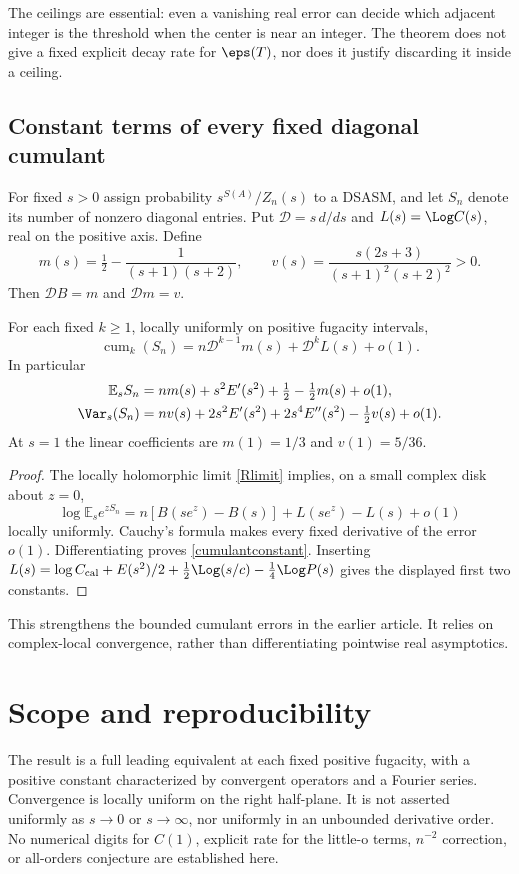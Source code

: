 The ceilings are essential: even a vanishing real error can decide
which adjacent integer is the threshold when the center is near an
integer. The theorem does not give a fixed explicit decay rate for
$\eps(T)$, nor does it justify discarding it inside a ceiling.

\subsection{Constant terms of every fixed diagonal cumulant}
For fixed $s>0$ assign probability $s^{S(A)}/Z_n(s)$ to a DSASM,
and let $S_n$ denote its number of nonzero diagonal entries.
Put $\mathcal D=s\,d/ds$ and $L(s)=\Log C(s)$, real on the
positive axis. Define
\[
 m(s)=\tfrac12-\frac1{(s+1)(s+2)},\qquad
 v(s)=\frac{s(2s+3)}{(s+1)^2(s+2)^2}>0.
\]
Then $\mathcal DB=m$ and $\mathcal Dm=v$.

\begin{corollary}\label{cor:cumulants}
For each fixed $k\ge1$, locally uniformly on positive fugacity intervals,
\begin{equation}\label{cumulantconstant}
 \operatorname{cum}_k(S_n)=n\mathcal D^{k-1}m(s)
                              +\mathcal D^kL(s)+o(1).
\end{equation}
In particular
\begin{align*}
 \mathbb E_sS_n&=nm(s)+s^2E'(s^2)+\tfrac12-\tfrac12m(s)+o(1),\\
 \Var_s(S_n)&=nv(s)+2s^2E'(s^2)+2s^4E''(s^2)-\tfrac12v(s)+o(1).
\end{align*}
At $s=1$ the linear coefficients are $m(1)=1/3$ and $v(1)=5/36$.
\end{corollary}
\begin{proof}
The locally holomorphic limit \eqref{Rlimit} implies, on a small
complex disk about $z=0$,
\[
 \log\mathbb E_se^{zS_n}
 =n[B(se^z)-B(s)]+L(se^z)-L(s)+o(1)
\]
locally uniformly. Cauchy's formula makes every fixed derivative
of the error $o(1)$. Differentiating proves
\eqref{cumulantconstant}. Inserting
$L(s)=\log C_{\rm cal}+E(s^2)/2+\tfrac12\Log(s/c)
-\tfrac14\Log P(s)$ gives the displayed first two constants.
\end{proof}
This strengthens the bounded cumulant errors in the earlier article.
It relies on complex-local convergence, rather than differentiating
pointwise real asymptotics.

\section{Scope and reproducibility}\label{sec:scope}
The result is a full leading equivalent at each fixed positive
fugacity, with a positive constant characterized by convergent
operators and a Fourier series. Convergence is locally uniform on
the right half-plane. It is not asserted uniformly as $s\to0$ or
$s\to\infty$, nor uniformly in an unbounded derivative order.
No numerical digits for $C(1)$, explicit rate for the little-o terms,
$n^{-2}$ correction, or all-orders conjecture are established here.

